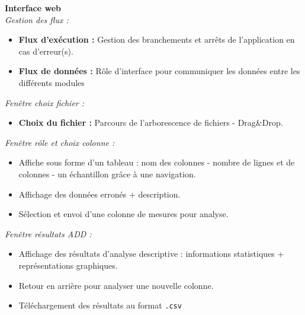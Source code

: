	\begin{frame}
		\textbf{Interface web}\\
		\textit{Gestion des flux :}
		\begin{itemize}
			\item \textbf{Flux d'exécution :} Gestion des branchements et arrêts de l'application en cas d'erreur(s).
			\item \textbf{Flux de données :} Rôle d'interface pour communiquer les données entre les différents modules
		\end{itemize} \pause
		 \vspace{1cm}
		 
		\textit{Fenêtre choix fichier :}
		\begin{itemize}
			\item \textbf{Choix du fichier :} Parcours de l'arborescence de fichiers - Drag\&Drop.
		\end{itemize}
	\end{frame}
	
	\begin{frame}
		\textit{Fenêtre rôle et choix colonne :}
		\begin{itemize}
		\item Affiche sous forme d'un tableau : nom des colonnes - nombre de lignes et de colonnes - un échantillon grâce à une navigation.
		\item Affichage des données erronés + description.
		\item Sélection et envoi d'une colonne de mesures pour analyse. 
		\end{itemize} \pause
		 \vspace{1cm}
		 
		\textit{Fenêtre résultats ADD :}
		\begin{itemize}
		\item Affichage des résultats d'analyse descriptive : informations statistiques + représentations graphiques.
		\item Retour en arrière pour analyser une nouvelle colonne.
		\item Téléchargement des résultats au format \lstinline!.csv!
		\end{itemize}
	\end{frame}
	

